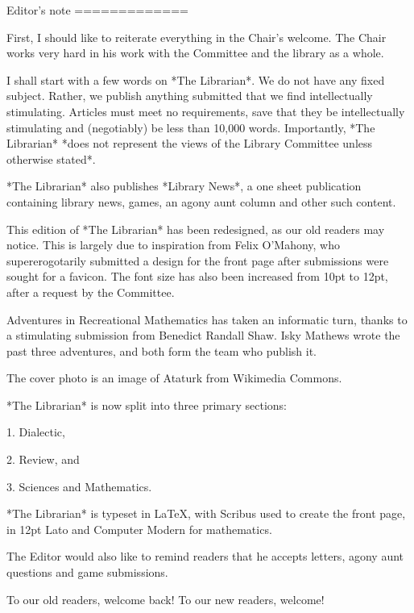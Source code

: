 Editor’s note
=============

First, I should like to reiterate everything in the Chair’s welcome. The
Chair works very hard in his work with the Committee and the library as
a whole.

I shall start with a few words on *The Librarian*. We do not have any
fixed subject. Rather, we publish anything submitted that we find
intellectually stimulating. Articles must meet no requirements, save
that they be intellectually stimulating and (negotiably) be less than
10,000 words. Importantly, *The Librarian* *does not represent the views
of the Library Committee unless otherwise stated*.

*The Librarian* also publishes *Library News*, a one sheet publication
containing library news, games, an agony aunt column and other such
content.

This edition of *The Librarian* has been redesigned, as our old readers
may notice. This is largely due to inspiration from Felix O’Mahony, who
supererogotarily submitted a design for the front page after submissions
were sought for a favicon. The font size has also been increased from
10pt to 12pt, after a request by the Committee.

Adventures in Recreational Mathematics has taken an informatic turn,
thanks to a stimulating submission from Benedict Randall Shaw. Isky
Mathews wrote the past three adventures, and both form the team who
publish it.

The cover photo is an image of Ataturk from Wikimedia Commons.

*The Librarian* is now split into three primary sections:

1.  Dialectic,

2.  Review, and

3.  Sciences and Mathematics.

*The Librarian* is typeset in LaTeX, with Scribus used to create the
front page, in 12pt Lato and Computer Modern for mathematics.

The Editor would also like to remind readers that he accepts letters,
agony aunt questions and game submissions.

To our old readers, welcome back! To our new readers, welcome!
